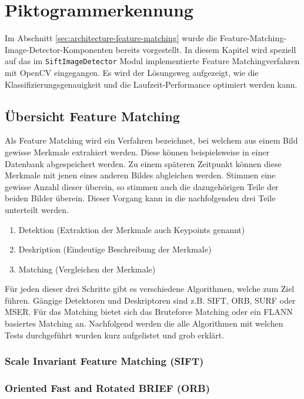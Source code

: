 \newpage

\section{Piktogrammerkennung}
Im Abschnitt \ref{sec:architecture-feature-matching} wurde die Feature-Matching-Image-Detector-Komponenten bereits vorgestellt. In diesem Kapitel wird speziell auf das im \texttt{SiftImageDetector} Modul implementierte Feature Matchingverfahren mit OpenCV eingegangen. Es wird der Lösungsweg aufgezeigt, wie die Klassifizierungsgenauigkeit und die Laufzeit-Performance optimiert werden kann.

\subsection{Übersicht Feature Matching}
Als Feature Matching wird ein Verfahren bezeichnet, bei welchem aus einem Bild gewisse Merkmale extrahiert werden. Diese können beispielsweise in einer Datenbank abgespeichert werden. Zu einem späteren Zeitpunkt können diese Merkmale mit jenen eines anderen Bildes abgleichen werden. Stimmen eine gewisse Anzahl dieser überein, so stimmen auch die dazugehörigen Teile der beiden Bilder überein. Dieser Vorgang kann in die nachfolgenden drei Teile unterteilt werden.

\begin{enumerate}
    \item Detektion (Extraktion der Merkmale auch Keypoints genannt)
    \item Deskription (Eindeutige Beschreibung der Merkmale)
    \item Matching (Vergleichen der Merkmale)
\end{enumerate}

Für jeden dieser drei Schritte gibt es verschiedene Algorithmen, welche zum Ziel führen. Gängige Detektoren und Deskriptoren sind z.B. SIFT, ORB, SURF oder MSER. Für das Matching bietet sich das Bruteforce Matching oder ein FLANN basiertes Matching an. Nachfolgend werden die alle Algorithmen mit welchen Tests durchgeführt wurden kurz aufgelistet und grob erklärt.

\subsubsection{Scale Invariant Feature Matching (SIFT)}

\subsubsection{Oriented Fast and Rotated BRIEF (ORB)}

